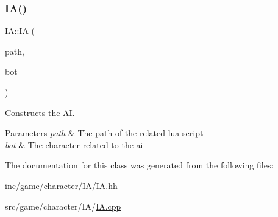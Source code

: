 \subsubsection{\texorpdfstring{I\+A()}{IA()}}
{\footnotesize\ttfamily I\+A\+::\+IA (\begin{DoxyParamCaption}\item[{std\+::string const}]{path,  }\item[{A\+Character $\ast$}]{bot }\end{DoxyParamCaption})}



Constructs the AI. 


\begin{DoxyParams}{Parameters}
{\em path} & The path of the related lua script \\
\hline
{\em bot} & The character related to the ai \\
\hline
\end{DoxyParams}


The documentation for this class was generated from the following files\+:\begin{DoxyCompactItemize}
\item 
inc/game/character/\+I\+A/\hyperlink{IA_8hh}{I\+A.\+hh}\item 
src/game/character/\+I\+A/\hyperlink{IA_8cpp}{I\+A.\+cpp}\end{DoxyCompactItemize}
